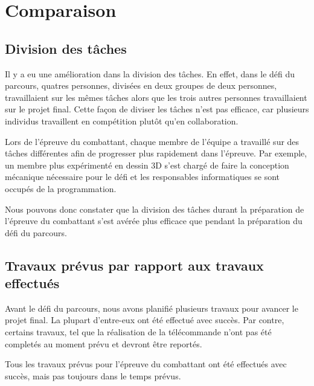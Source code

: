 \section{Comparaison}

\subsection{Division des tâches}

\begin{spacing}{1.5}
    Il y a eu une amélioration dans la division des tâches.
    En effet, dans le défi du parcours, quatres personnes, divisées en deux groupes de deux personnes, travaillaient sur les mêmes tâches alors que les trois autres personnes travaillaient sur le projet final.
    Cette façon de diviser les tâches n'est pas efficace, car plusieurs individus travaillent en compétition plutôt qu'en collaboration.
\end{spacing}

\begin{spacing}{1.5}
    Lors de l'épreuve du combattant, chaque membre de l'équipe a travaillé sur des tâches différentes afin de progresser plus rapidement dans l'épreuve.
    Par exemple, un membre plus expérimenté en dessin 3D s'est chargé de faire la conception mécanique nécessaire pour le défi et les responsables informatiques se sont occupés de la programmation.
\end{spacing}

\begin{spacing}{1.5}
    Nous pouvons donc constater que la division des tâches durant la préparation de l'épreuve du combattant s'est avérée plus efficace que pendant la préparation du défi du parcours.
\end{spacing}

\subsection{Travaux prévus par rapport aux travaux effectués}

\begin{spacing}{1.5}
    Avant le défi du parcours, nous avons planifié plusieurs travaux pour avancer le projet final.
    La plupart d'entre-eux ont été effectué avec succès.
    Par contre, certains travaux, tel que la réalisation de la télécommande n'ont pas été completés au moment prévu et devront être reportés.
\end{spacing}

\begin{spacing}{1.5}
    Tous les travaux prévus pour l'épreuve du combattant ont été effectués avec succès, mais pas toujours dans le temps prévus.
\end{spacing}

